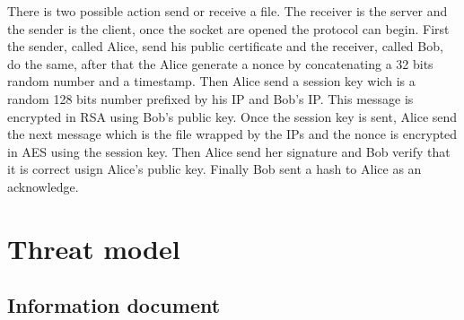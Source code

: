 \documentclass[a4paper,12pt]{article}
\begin{document}
There is two possible action send or receive a file. The receiver is the server and the sender is the client, once the socket are opened the protocol can begin. First the sender, called Alice, send his public certificate and the receiver, called Bob, do the same, after that the Alice generate a nonce by concatenating a 32 bits random number and a timestamp. Then Alice send a session key wich is a random 128 bits number prefixed by his IP and Bob's IP. This message is encrypted in RSA using Bob's public key. Once the session key is sent, Alice send the next message which is the file wrapped by the IPs and the nonce is encrypted in AES using the session key. Then Alice send her signature and Bob verify that it is correct usign Alice's public key. Finally Bob sent a hash to Alice as an acknowledge.


\section{Threat model}


\subsection{Information document}
\end{document}
